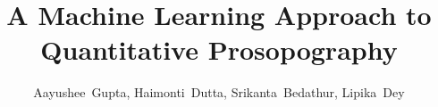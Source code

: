 \documentclass[10pt,journal,compsoc]{IEEEtran}
\begin{document}
%
\title{A Machine Learning Approach to Quantitative Prosopography}
%
%
%
%


\author{Aayushee~Gupta, Haimonti~Dutta, Srikanta~Bedathur, Lipika~Dey}
\end{document}
